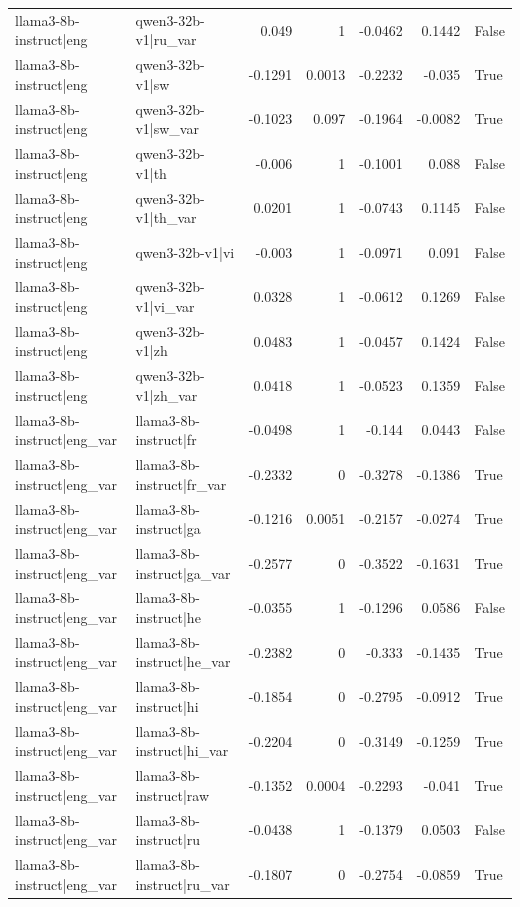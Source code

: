 \begin{table}
\begin{tabular}{l l r r r r l}
llama3-8b-instruct|eng & qwen3-32b-v1|ru_var & 0.049 & 1 & -0.0462 & 0.1442 & False \\
llama3-8b-instruct|eng & qwen3-32b-v1|sw & -0.1291 & 0.0013 & -0.2232 & -0.035 & True \\
llama3-8b-instruct|eng & qwen3-32b-v1|sw_var & -0.1023 & 0.097 & -0.1964 & -0.0082 & True \\
llama3-8b-instruct|eng & qwen3-32b-v1|th & -0.006 & 1 & -0.1001 & 0.088 & False \\
llama3-8b-instruct|eng & qwen3-32b-v1|th_var & 0.0201 & 1 & -0.0743 & 0.1145 & False \\
llama3-8b-instruct|eng & qwen3-32b-v1|vi & -0.003 & 1 & -0.0971 & 0.091 & False \\
llama3-8b-instruct|eng & qwen3-32b-v1|vi_var & 0.0328 & 1 & -0.0612 & 0.1269 & False \\
llama3-8b-instruct|eng & qwen3-32b-v1|zh & 0.0483 & 1 & -0.0457 & 0.1424 & False \\
llama3-8b-instruct|eng & qwen3-32b-v1|zh_var & 0.0418 & 1 & -0.0523 & 0.1359 & False \\
llama3-8b-instruct|eng_var & llama3-8b-instruct|fr & -0.0498 & 1 & -0.144 & 0.0443 & False \\
llama3-8b-instruct|eng_var & llama3-8b-instruct|fr_var & -0.2332 & 0 & -0.3278 & -0.1386 & True \\
llama3-8b-instruct|eng_var & llama3-8b-instruct|ga & -0.1216 & 0.0051 & -0.2157 & -0.0274 & True \\
llama3-8b-instruct|eng_var & llama3-8b-instruct|ga_var & -0.2577 & 0 & -0.3522 & -0.1631 & True \\
llama3-8b-instruct|eng_var & llama3-8b-instruct|he & -0.0355 & 1 & -0.1296 & 0.0586 & False \\
llama3-8b-instruct|eng_var & llama3-8b-instruct|he_var & -0.2382 & 0 & -0.333 & -0.1435 & True \\
llama3-8b-instruct|eng_var & llama3-8b-instruct|hi & -0.1854 & 0 & -0.2795 & -0.0912 & True \\
llama3-8b-instruct|eng_var & llama3-8b-instruct|hi_var & -0.2204 & 0 & -0.3149 & -0.1259 & True \\
llama3-8b-instruct|eng_var & llama3-8b-instruct|raw & -0.1352 & 0.0004 & -0.2293 & -0.041 & True \\
llama3-8b-instruct|eng_var & llama3-8b-instruct|ru & -0.0438 & 1 & -0.1379 & 0.0503 & False \\
llama3-8b-instruct|eng_var & llama3-8b-instruct|ru_var & -0.1807 & 0 & -0.2754 & -0.0859 & True \\

\end{tabular}
\end{table}
